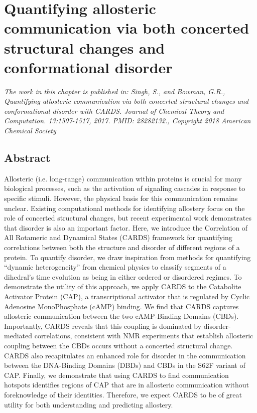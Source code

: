 \documentclass[../main.tex]{subfiles}
\begin{document}
    \chapter{Quantifying allosteric communication via both concerted structural changes and conformational disorder} \label{ch:CARDS}
    

    \graphicspath{{Chapter3/}}
    \captionsetup{labelfont=bf}
    
    \textit{The work in this chapter is published in: Singh, S., 
    and Bowman, G.R., Quantifying allosteric communication via both concerted 
    structural changes and conformational disorder with CARDS. Journal of 
    Chemical Theory and Computation. 13:1507-1517, 2017. PMID: 28282132., Copyright 2018 American Chemical Society} \cite{Singh:2017hh} 
    
    \section{Abstract}
    Allosteric (i.e. long-range) communication within proteins is crucial for many biological processes, such as the activation of signaling cascades in response to specific stimuli. However, the physical basis for this communication remains unclear. Existing computational methods for identifying allostery focus on the role of concerted structural changes, but recent experimental work demonstrates that disorder is also an important factor. Here, we introduce the Correlation of All Rotameric and Dynamical States (CARDS) framework for quantifying correlations between both the structure and disorder of different regions of a protein. To quantify disorder, we draw inspiration from methods for quantifying “dynamic heterogeneity” from chemical physics to classify segments of a dihedral’s time evolution as being in either ordered or disordered regimes. To demonstrate the utility of this approach, we apply CARDS to the Catabolite Activator Protein (CAP), a transcriptional activator that is regulated by Cyclic Adenosine MonoPhosphate (cAMP) binding. We find that CARDS captures allosteric communication between the two cAMP-Binding Domains (CBDs). Importantly, CARDS reveals that this coupling is dominated by disorder-mediated correlations, consistent with NMR experiments that establish allosteric coupling between the CBDs occurs without a concerted structural change. CARDS also recapitulates an enhanced role for disorder in the communication between the DNA-Binding Domains (DBDs) and CBDs in the S62F variant of CAP. Finally, we demonstrate that using CARDS to find communication hotspots identifies regions of CAP that are in allosteric communication without foreknowledge of their identities. Therefore, we expect CARDS to be of great utility for both understanding and predicting allostery. 
        
\end{document}
